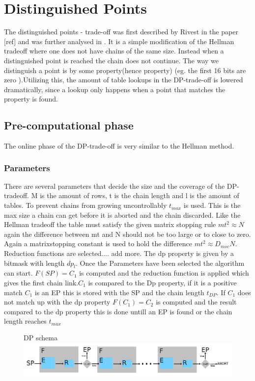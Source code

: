 \section{Distinguished Points}
\label{sec:dptheory}

The distinguished points - trade-off was first described by Rivest in
the paper [ref] and was further analysed in \cite{DP}. It is a simple modification of the Hellman tradeoff
where one does not have chains of the same size. Instead when a
distinguished point is reached the chain does not continue. The way we distinguish a point is by some property(hence property) (eg. the first 16 bits are zero ).Utilizing this, the amount of table lookups in the DP-trade-off is lowered dramatically, since a lookup only happens when a point that matches the property is found.
\subsection{Pre-computational phase}
The online phase of the DP-trade-off is very similar to the Hellman method.
\subsubsection{Parameters}
There are several parameters that decide the size and the coverage of
the DP-tradeoff. M is the amount of rows, t is the chain length  and l is the amount of tables.
To prevent chains from growing uncontrollably $t_{max}$ is used. This is the max size a chain can get before it is aborted and the chain discarded.
Like the Hellman tradeoff the table must satisfy the
given matrix stopping rule $mt^2\approx N$ again the difference between
mt and N should not be too large or to close to zero. Again a
matrixstopping constant is used to hold the difference $mt^2\approx
D_{msc}N$. Reduction functions are selected.... add more. The dp property is given by a bitmask with length $dp_l$.
Once the Parameters have been selected the algorithm can start. $F(SP)=C_1$ is computed and the reduction function is applied which gives the first chain link.$C_1$ is compared to the Dp property, if it is a positive match $C_1$ is an EP this is stored with the SP and the chain length $t_{DP}$. If $C_1$ does not match up with the dp property $F(C_1)=C_2$ is computed and the result compared to the dp property this is done untill an EP is found or the chain length reaches $t_{max}$
\begin{figure}[th]
  DP schema
  \includegraphics[width=\textwidth]{figures/DPSchema.png}
  \centering
\end{figure}
